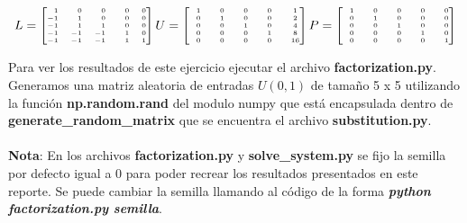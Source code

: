 \documentclass[12pt,letterpaper]{article}
\begin{document}
\begin{equation*}
    \tiny{
    L = \begin{bmatrix}
            \phantom{-}1 & \phantom{-}0 & \phantom{-}0 & \phantom{-}0 & 		   0 \\ 
                      -1 & \phantom{-}1 & \phantom{-}0 & \phantom{-}0 & 		   0 \\ 
                      -1 & \phantom{-}1 & \phantom{-}1 & \phantom{-}0 & 		   0 \\ 
            		  -1 &           -1 &           -1 & \phantom{-}1 & 		   0 \\ 
                      -1 &           -1 &           -1 & \phantom{-}1 &            1
        \end{bmatrix}
    U = \begin{bmatrix}
            \phantom{-}1 & \phantom{-}0 & \phantom{-}0 & \phantom{-}0 & \phantom{-}1 \\ 
            \phantom{-}0 & \phantom{-}1 & \phantom{-}0 & \phantom{-}0 & \phantom{-}2 \\ 
            \phantom{-}0 & \phantom{-}0 & \phantom{-}1 & \phantom{-}0 & \phantom{-}4 \\ 
            \phantom{-}0 & \phantom{-}0 & \phantom{-}0 & \phantom{-}1 & \phantom{-}8 \\ 
            \phantom{-}0 & \phantom{-}0 & \phantom{-}0 & \phantom{-}0 & \phantom{-}16
        \end{bmatrix}
    P = \begin{bmatrix}
            \phantom{-}1 & \phantom{-}0 & \phantom{-}0 & \phantom{-}0 & \phantom{-}0 \\ 
            \phantom{-}0 & \phantom{-}1 & \phantom{-}0 & \phantom{-}0 & \phantom{-}0 \\ 
            \phantom{-}0 & \phantom{-}0 & \phantom{-}1 & \phantom{-}0 & \phantom{-}0 \\ 
            \phantom{-}0 & \phantom{-}0 & \phantom{-}0 & \phantom{-}1 & \phantom{-}0 \\ 
            \phantom{-}0 & \phantom{-}0 & \phantom{-}0 & \phantom{-}0 & \phantom{-}1
        \end{bmatrix}
    }
\end{equation*}

Para ver los resultados de este ejercicio ejecutar el archivo \textbf{factorization.py}.\\

Generamos una matriz aleatoria de entradas $U(0,1)$ de tama\~no 5 x 5 utilizando la funci\'on \textbf{np.random.rand} del modulo numpy que est\'a encapsulada dentro de \textbf{generate\_random\_matrix} que se encuentra el archivo \textbf{substitution.py}. \\ \\ \textbf{Nota}: En los archivos \textbf{factorization.py} y \textbf{solve\_system.py} se fijo la semilla por defecto igual a 0 para poder recrear los resultados presentados en este reporte. Se puede cambiar la semilla llamando al c\'odigo de la forma \textbf{\textit{python factorization.py semilla}}.
\end{document}
